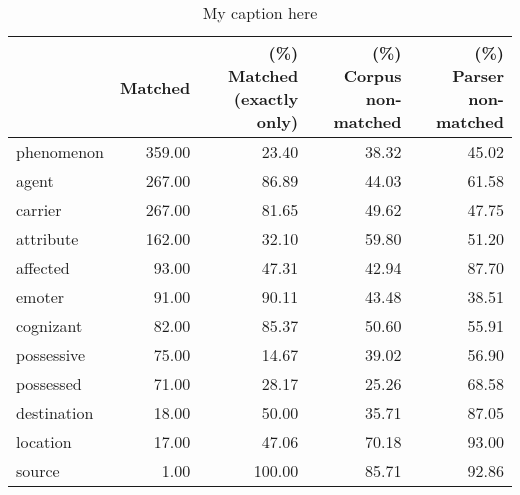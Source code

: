 \begin{table}[!ht]
\centering
\begin{tabular}{lrrrr}
\toprule
{} &  Matched &  (\%) Matched (exactly only) &  (\%) Corpus non-matched &  (\%) Parser non-matched \\
\midrule
phenomenon  &   359.00 &                       23.40 &                   38.32 &                   45.02 \\
agent       &   267.00 &                       86.89 &                   44.03 &                   61.58 \\
carrier     &   267.00 &                       81.65 &                   49.62 &                   47.75 \\
attribute   &   162.00 &                       32.10 &                   59.80 &                   51.20 \\
affected    &    93.00 &                       47.31 &                   42.94 &                   87.70 \\
emoter      &    91.00 &                       90.11 &                   43.48 &                   38.51 \\
cognizant   &    82.00 &                       85.37 &                   50.60 &                   55.91 \\
possessive  &    75.00 &                       14.67 &                   39.02 &                   56.90 \\
possessed   &    71.00 &                       28.17 &                   25.26 &                   68.58 \\
destination &    18.00 &                       50.00 &                   35.71 &                   87.05 \\
location    &    17.00 &                       47.06 &                   70.18 &                   93.00 \\
source      &     1.00 &                      100.00 &                   85.71 &                   92.86 \\
\bottomrule
\end{tabular}
\caption{My caption here}
\label{tab:PARTICIPANT_ROLE_MOST_USED-oe-relative}
\end{table}